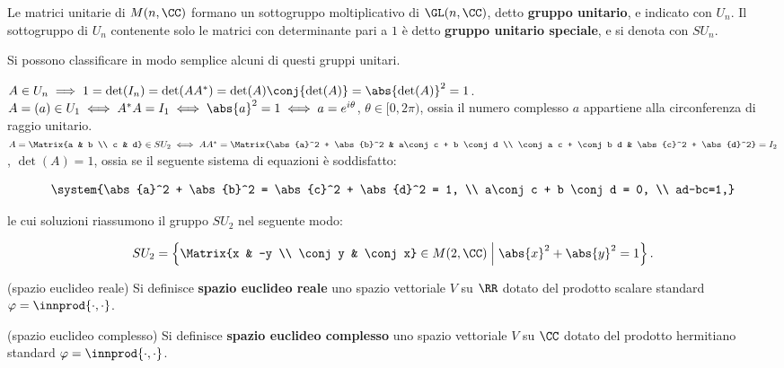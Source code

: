 \begin{definition}
	Le matrici unitarie di $M(n, \CC)$ formano un sottogruppo moltiplicativo di $\GL(n, \CC)$, detto \textbf{gruppo unitario},
	e indicato con $U_n$. Il sottogruppo di $U_n$ contenente solo le matrici con determinante pari a $1$ è
	detto \textbf{gruppo unitario speciale}, e si denota con $SU_n$.
\end{definition}

\begin{remark}\nl
	Si possono classificare in modo semplice alcuni di questi gruppi unitari.
	
	\li $A \in U_n \implies 1 = \det(I_n) = \det(A A^*) = \det(A) \conj{\det(A)} = \abs{\det(A)}^2 = 1$. \\
	\li $A = (a) \in U_1 \iff A^* A = I_1 \iff \abs{a}^2 = 1 \iff a = e^{i\theta}$, $\theta \in [0, 2\pi)$, ossia il numero complesso $a$ appartiene alla circonferenza di raggio unitario. \\
	\li $A = \Matrix{a & b \\ c & d} \in SU_2 \iff A A^* = \Matrix{\abs{a}^2 + \abs{b}^2 & a\conj c + b \conj d \\ \conj a c + \conj b d & \abs{c}^2 + \abs{d}^2} = I_2$, $\det(A) = 1$, ossia se il seguente
	sistema di equazioni è soddisfatto:
	
	\[ \system{\abs{a}^2 + \abs{b}^2 = \abs{c}^2 + \abs{d}^2 = 1, \\ a\conj c + b \conj d = 0, \\ ad-bc=1,} \]
	
	le cui soluzioni riassumono il gruppo $SU_2$ nel seguente modo:
	
	\[ SU_2 = \left\{ \Matrix{x & -y \\ \conj y & \conj x} \in M(2, \CC) \;\middle\vert\; \abs{x}^2 + \abs{y}^2 = 1 \right\}. \]
	
\end{remark}

\begin{definition} (spazio euclideo reale)
	Si definisce \textbf{spazio euclideo reale} uno spazio vettoriale $V$ su $\RR$ dotato
	del prodotto scalare standard $\varphi = \innprod{\cdot, \cdot}$.
\end{definition}

\begin{definition} (spazio euclideo complesso)
	Si definisce \textbf{spazio euclideo complesso} uno spazio vettoriale $V$ su $\CC$ dotato
	del prodotto hermitiano standard $\varphi = \innprod{\cdot, \cdot}$.
\end{definition}

